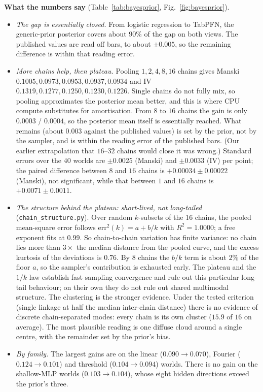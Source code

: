 \documentclass[11pt]{article}
\theoremstyle{definition}
\theoremstyle{remark}
\begin{document}
\textbf{What the numbers say} (Table~\ref{tab:bayesprior}, Fig.~\ref{fig:bayesprior}).
\begin{itemize}
  \item \emph{The gap is essentially closed.} From logistic regression to TabPFN, the generic-prior posterior covers about $90\%$ of the gap on both views. The published values are read off bars, to about $\pm0.005$, so the remaining difference is within that reading error.
  \item \emph{More chains help, then plateau.} Pooling $1,2,4,8,16$ chains gives Manski $0.1005, 0.0973, 0.0953, 0.0937, 0.0934$ and IV $0.1319, 0.1277, 0.1250, 0.1230, 0.1226$. Single chains do not fully mix, so pooling approximates the posterior mean better, and this is where CPU compute substitutes for amortisation. From $8$ to $16$ chains the gain is only $0.0003$ / $0.0004$, so the posterior mean itself is essentially reached. What remains (about $0.003$ against the published values) is set by the prior, not by the sampler, and is within the reading error of the published bars. (Our earlier extrapolation that $16$--$32$ chains would close it was wrong.) Standard errors over the $40$ worlds are $\pm0.0025$ (Manski) and $\pm0.0033$ (IV) per point; the paired difference between $8$ and $16$ chains is $+0.00034\pm0.00022$ (Manski), not significant, while that between $1$ and $16$ chains is $+0.0071\pm0.0011$.
  \item \emph{The structure behind the plateau: short-lived, not long-tailed} (\texttt{chain\_structure.py}). Over random $k$-subsets of the $16$ chains, the pooled mean-square error follows $\mathrm{err}^2(k)=a+b/k$ with $R^2=1.0000$; a free exponent fits at $0.99$. So chain-to-chain variation has finite variance: no chain lies more than $3\times$ the median distance from the pooled curve, and the excess kurtosis of the deviations is $0.76$. By $8$ chains the $b/k$ term is about $2\%$ of the floor $a$, so the sampler's contribution is exhausted early. The plateau and the $1/k$ law establish fast sampling convergence and rule out this particular long-tail behaviour; on their own they do not rule out shared multimodal structure. The clustering is the stronger evidence. Under the tested criterion (single linkage at half the median inter-chain distance) there is no evidence of discrete chain-separated modes: every chain is its own cluster ($15.9$ of $16$ on average). The most plausible reading is one diffuse cloud around a single centre, with the remainder set by the prior's bias.
  \item \emph{By family.} The largest gains are on the linear ($0.090\to0.070$), Fourier ($0.124\to0.101$) and threshold ($0.104\to0.094$) worlds. There is no gain on the shallow-MLP worlds ($0.103\to0.104$), whose eight hidden directions exceed the prior's three.

\end{itemize}
\end{document}
